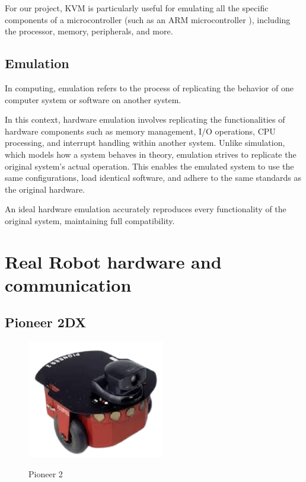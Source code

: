 \documentclass[../monografia.tex]{subfiles}
\begin{document}
For our project, KVM is particularly useful for emulating all the specific components of a microcontroller (such as an ARM microcontroller \cite{wikipedia_arm_architecture_24}), including the processor, memory, peripherals, and more.


\subsection{Emulation}

In computing, emulation refers to the process of replicating the behavior of one computer system or software on another system.

In this context, hardware emulation involves replicating the functionalities of hardware components such as memory management, I/O operations, CPU processing, and interrupt handling within another system. Unlike simulation, which models how a system behaves in theory, emulation strives to replicate the original system's actual operation. This enables the emulated system to use the same configurations, load identical software, and adhere to the same standards as the original hardware.

An ideal hardware emulation accurately reproduces every functionality of the original system, maintaining full compatibility.


\section{Real Robot hardware and communication}

\subsection{Pioneer 2DX}

\begin{figure}
    \centering
    \caption{Pioneer 2}
    \includegraphics[width=6cm]{pioneer2.png}
    \label{fig: Pioneer 2}
\end{figure}
\end{document}
